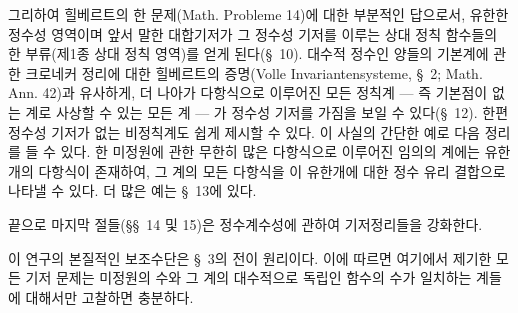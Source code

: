 
그리하여 힐베르트의 한 문제(Math. Probleme 14)에 대한 부분적인 답으로서, 유한한 정수성 영역이며 앞서 말한 대합기저가 그 정수성 기저를 이루는 상대 정칙 함수들의 한 부류(제1종 상대 정칙 영역)를 얻게 된다(\S\ 10). 대수적 정수인 양들의 기본계에 관한 크로네커 정리에 대한 힐베르트의 증명(Volle Invariantensysteme, \S\ 2; Math. Ann. 42)과 유사하게, 더 나아가 다항식으로 이루어진 모든 정칙계 --- 즉 기본점이 없는 계로 사상할 수 있는 모든 계 --- 가 정수성 기저를 가짐을 보일 수 있다(\S\ 12). 한편 정수성 기저가 없는 비정칙계도 쉽게 제시할 수 있다. 이 사실의 간단한 예로 다음 정리를 들 수 있다. \glqq{}한 미정원에 관한 무한히 많은 다항식으로 이루어진 임의의 계에는 유한개의 다항식이 존재하여, 그 계의 모든 다항식을 이 유한개에 대한 정수 유리 결합으로 나타낼 수 있다.\grqq{} 더 많은 예는 \S\ 13에 있다.

끝으로 마지막 절들(\S\S\ 14 및 15)은 정수계수성에 관하여 기저정리들을 강화한다.

이 연구의 본질적인 보조수단은 \S\ 3의 전이 원리이다. 이에 따르면 여기에서 제기한 모든 기저 문제는 미정원의 수와 그 계의 대수적으로 독립인 함수의 수가 일치하는 계들에 대해서만 고찰하면 충분하다.
